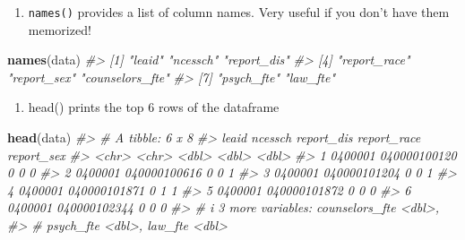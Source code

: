 \documentclass[
]{book}
\newenvironment{Shaded}{\begin{snugshade}}{\end{snugshade}}
\newcommand{\CommentTok}[1]{\textcolor[rgb]{0.56,0.35,0.01}{\textit{#1}}}
\newcommand{\FunctionTok}[1]{\textcolor[rgb]{0.13,0.29,0.53}{\textbf{#1}}}
\newcommand{\NormalTok}[1]{#1}
\providecommand{\tightlist}{%
  \setlength{\itemsep}{0pt}\setlength{\parskip}{0pt}}
\begin{document}
\begin{enumerate}
\def\labelenumi{\arabic{enumi}.}
\setcounter{enumi}{2}
\tightlist
\item
  \texttt{names()} provides a list of column names. Very useful if you don't have them memorized!
\end{enumerate}

\begin{Shaded}
\begin{Highlighting}[]
\FunctionTok{names}\NormalTok{(data)}
\CommentTok{\#\textgreater{} [1] "leaid"          "ncessch"        "report\_dis"    }
\CommentTok{\#\textgreater{} [4] "report\_race"    "report\_sex"     "counselors\_fte"}
\CommentTok{\#\textgreater{} [7] "psych\_fte"      "law\_fte"}
\end{Highlighting}
\end{Shaded}

\begin{enumerate}
\def\labelenumi{\arabic{enumi}.}
\setcounter{enumi}{3}
\tightlist
\item
  head() prints the top 6 rows of the dataframe
\end{enumerate}

\begin{Shaded}
\begin{Highlighting}[]
\FunctionTok{head}\NormalTok{(data)}
\CommentTok{\#\textgreater{} \# A tibble: 6 x 8}
\CommentTok{\#\textgreater{}   leaid   ncessch      report\_dis report\_race report\_sex}
\CommentTok{\#\textgreater{}   \textless{}chr\textgreater{}   \textless{}chr\textgreater{}             \textless{}dbl\textgreater{}       \textless{}dbl\textgreater{}      \textless{}dbl\textgreater{}}
\CommentTok{\#\textgreater{} 1 0400001 040000100120          0           0          0}
\CommentTok{\#\textgreater{} 2 0400001 040000100616          0           0          1}
\CommentTok{\#\textgreater{} 3 0400001 040000101204          0           0          1}
\CommentTok{\#\textgreater{} 4 0400001 040000101871          0           1          1}
\CommentTok{\#\textgreater{} 5 0400001 040000101872          0           0          0}
\CommentTok{\#\textgreater{} 6 0400001 040000102344          0           0          0}
\CommentTok{\#\textgreater{} \# i 3 more variables: counselors\_fte \textless{}dbl\textgreater{},}
\CommentTok{\#\textgreater{} \#   psych\_fte \textless{}dbl\textgreater{}, law\_fte \textless{}dbl\textgreater{}}
\end{Highlighting}
\end{Shaded}
\end{document}
